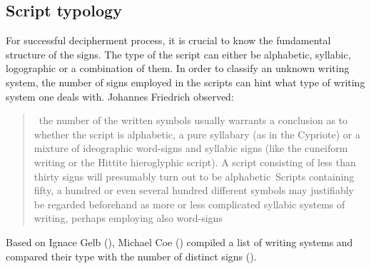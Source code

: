\documentclass[../main.tex]{subfiles}
\begin{document}
\subsection{Script typology}
For successful decipherment process, it is crucial to know the fundamental structure of the signs.
The type of the script can either be alphabetic, syllabic, logographic or a combination of them.
In order to classify an unknown writing system, the number of signs employed in the scripts
can hint what type of writing system one deals with.
Johannes Friedrich observed:
\blockquote[{\cite[152]{friedrich1957}}]{\elide~the number of the written symbols usually warrants a 
conclusion as to whether the script is alphabetic, a pure syllabary (as in the Cypriote) or a
mixture of ideographic word-signs and syllabic signs (like the cuneiform writing or the Hittite
hieroglyphic script). A script consisting of less than thirty signs will presumably turn out to
be alphabetic\elide~Scripts containing fifty, a hundred or even several hundred different symbols
may justifiably be regarded beforehand as more or less complicated syllabic systems of writing,
perhaps employing also word-signs\elide}.
Based on Ignace Gelb (\cite[115]{gelb1963}), Michael Coe (\cite[43]{coe1992}) compiled a list
of writing systems and compared their type with the number of distinct signs
().
\end{document}
